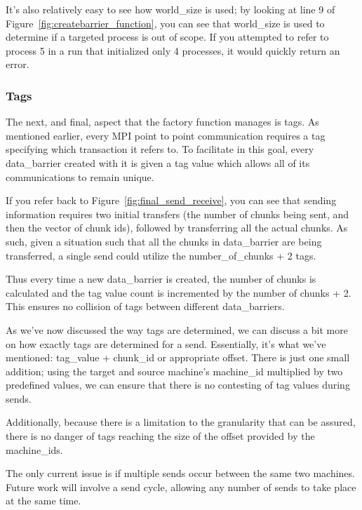 \documentclass[../thesis.tex]{subfiles}
\begin{document}
        It's also relatively easy to see how world\_size is used; by looking at line 9 of Figure~\ref{fig:createbarrier_function}, you can see that world\_size is used to determine if a targeted process is out of scope. If you attempted to refer to process 5 in a run that initialized only 4 processes, it would quickly return an error.

    \subsubsection{Tags} %
    \label{ssub:tags}
        The next, and final, aspect that the factory function manages is tags. As mentioned earlier, every MPI point to point communication requires a tag specifying which transaction it refers to. To facilitate in this goal, every data\_barrier created with it is given a tag value which allows all of its communications to remain unique.

        If you refer back to Figure~\ref{fig:final_send_receive}, you can see that sending information requires two initial transfers (the number of chunks being sent, and then the vector of chunk ids), followed by transferring all the actual chunks. As such, given a situation such that all the chunks in data\_barrier are being transferred, a single send could utilize the number\_of\_chunks + 2 tags.

        Thus every time a new data\_barrier is created, the number of chunks is calculated and the tag value count is incremented by the number of chunks + 2. This ensures no collision of tags between different data\_barriers.

        As we've now discussed the way tags are determined, we can discuss a bit more on how exactly tags are determined for a send. Essentially, it's what we've mentioned: tag\_value + chunk\_id or appropriate offset. There is just one small addition; using the target and source machine's machine\_id multiplied by two predefined values, we can ensure that there is no contesting of tag values during sends. 
        
        Additionally, because there is a limitation to the granularity that can be assured, there is no danger of tags reaching the size of the offset provided by the machine\_ids.

        The only current issue is if multiple sends occur between the same two machines. Future work will involve a send cycle, allowing any number of sends to take place at the same time.
\end{document}
